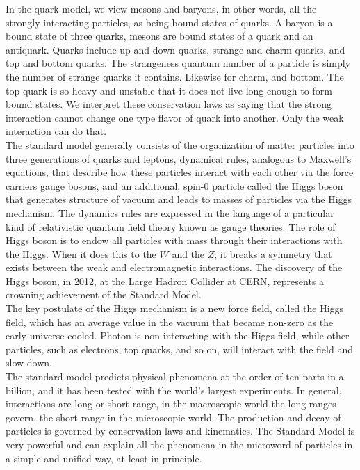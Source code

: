 \documentclass[11pt]{article}
\theoremstyle{break}
\theoremstyle{break}
\begin{document}
In the quark model, we view mesons and baryons, in other words, all the strongly-interacting particles, as being bound states of quarks. A baryon is a bound state of three quarks, mesons are bound states of a quark and an antiquark. Quarks include up and down quarks, strange and charm quarks, and top and bottom quarks.  The strangeness quantum number of a particle is simply the number of strange quarks it contains. Likewise for charm, and bottom. The top quark is so heavy and unstable that it does not live long enough to form bound states. We interpret these conservation laws as saying that the strong interaction cannot change
one type flavor of quark into another. Only the weak interaction can do that.\\

The standard model generally consists of the organization of matter particles into three generations of quarks and leptons,  dynamical rules, analogous to Maxwell's equations, that describe how these particles interact with each other via the force carriers gauge bosons, and an additional, spin-0 particle called the Higgs boson that generates structure of vacuum and leads to masses of particles via the Higgs mechanism. The dynamics rules are expressed in the language of a particular kind of relativistic quantum field theory known as gauge theories. The role of Higgs boson is to endow all particles with mass through their interactions with the Higgs. When it does this to the $W$ and the $Z$, it
breaks a symmetry that exists between the weak and electromagnetic interactions. The discovery of the Higgs boson, in 2012, at the Large Hadron Collider at CERN, represents a crowning achievement of the Standard Model.\\

The key postulate of the Higgs mechanism is a new force field, called the Higgs field, which has an average value in the vacuum that became non-zero as the early universe cooled. Photon is non-interacting with the Higgs field, while other particles, such as electrons, top quarks, and so on, will interact with the field and slow down.\\

The standard model predicts physical phenomena at the order of ten parts in a billion, and it  has been tested with the world's largest experiments. In general, interactions are long or short range, in the macroscopic world the long ranges govern, the short range in the microscopic world. The production and decay of particles is governed by conservation laws and kinematics. The Standard Model is very powerful and can explain all the phenomena in the microword of particles in a simple and unified way, at least in principle. \\
\end{document}
